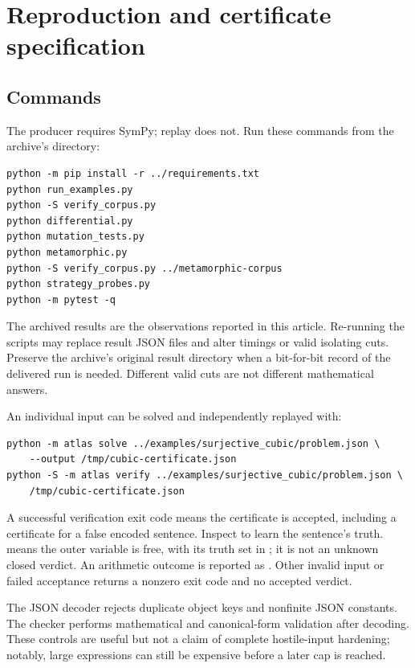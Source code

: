 \section{Reproduction and certificate specification}
\subsection{Commands}
The producer requires SymPy; replay does not. Run these commands from the archive's  directory:
\begin{lstlisting}
python -m pip install -r ../requirements.txt
python run_examples.py
python -S verify_corpus.py
python differential.py
python mutation_tests.py
python metamorphic.py
python -S verify_corpus.py ../metamorphic-corpus
python strategy_probes.py
python -m pytest -q
\end{lstlisting}
The archived results are the observations reported in this article. Re-running the scripts may replace result JSON files and alter timings or valid isolating cuts. Preserve the archive's original result directory when a bit-for-bit record of the delivered run is needed. Different valid cuts are not different mathematical answers.

An individual input can be solved and independently replayed with:
\begin{lstlisting}
python -m atlas solve ../examples/surjective_cubic/problem.json \
    --output /tmp/cubic-certificate.json
python -S -m atlas verify ../examples/surjective_cubic/problem.json \
    /tmp/cubic-certificate.json
\end{lstlisting}
A successful verification exit code means the certificate is accepted, including a certificate for a false encoded sentence. Inspect  to learn the sentence's truth.  means the outer variable is free, with its truth set in ; it is not an unknown closed verdict. An arithmetic  outcome is reported as \unknown{}. Other invalid input or failed acceptance returns a nonzero exit code and no accepted verdict.

The JSON decoder rejects duplicate object keys and nonfinite JSON constants. The checker performs mathematical and canonical-form validation after decoding. These controls are useful but not a claim of complete hostile-input hardening; notably, large expressions can still be expensive before a later cap is reached.


